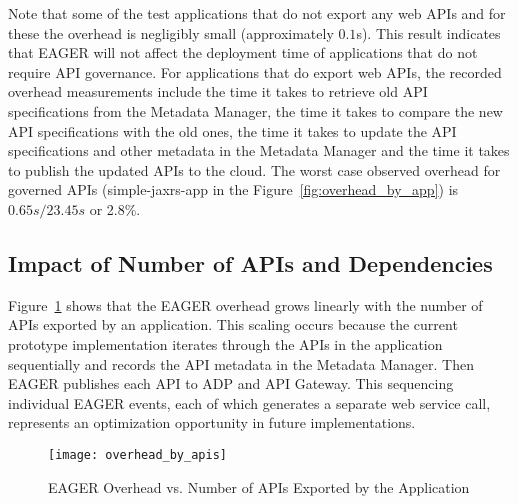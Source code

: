 Note that some of the test applications that do not export any web APIs and
for these the overhead
is negligibly small (approximately $0.1$s). 
This result indicates that EAGER
will not affect the deployment time of applications that do not require API
governance. 
For applications that do
export web APIs, the recorded overhead measurements include the time it takes to
retrieve old API specifications from the Metadata Manager, the time it takes
to compare the new API specifications with the old ones, the time it takes to
update the API specifications and other metadata in the Metadata Manager and
the time it takes to publish the updated APIs to the cloud.  
The worst case observed overhead for governed APIs (simple-jaxrs-app in the
Figure~\ref{fig:overhead_by_app}) is
$0.65s / 23.45s$ or 2.8\%.


\subsection{Impact of Number of APIs and Dependencies}

Figure~\ref{fig:overhead_by_apis} shows that the EAGER overhead grows linearly
with the number of APIs exported by an application.  This scaling occurs
because the current prototype implementation iterates through the APIs in the
application sequentially and records the API metadata in the Metadata Manager.
Then EAGER publishes each API to ADP and API Gateway. This sequencing
individual EAGER events, each of which generates a separate web service call,
represents an optimization opportunity in future implementations.

\begin{figure}
\centering
\texttt{[image: overhead\_by\_apis]}
\vspace{-0.01in}
\caption{EAGER Overhead vs. Number of APIs Exported by the Application}
\label{fig:overhead_by_apis}
\end{figure}

